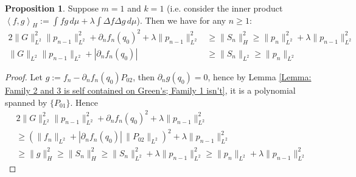 \documentclass[12pt]{amsart}
\theoremstyle{plain}
\theoremstyle{definition}
\newtheorem{proposition}{Proposition}[section]
\newcommand{\inner}[2]{\left \langle #1, #2\right \rangle}
\newcommand{\lap}{\Delta}
\begin{document}
\begin{proposition}\label{k=1L2 and S2 estimates}
Suppose $m=1$ and $k=1$ (i.e. consider the inner product $\inner{f}{g}_H:=\int fg\,d\mu+\lambda\int \lap f\lap g\,d\mu$). Then we have for any $n\ge 1$:
\begin{align}2\|G\|_{L^2}^2\|p_{n-1}\|^2_{L^2}+\partial_nf_n(q_0)^2+\lambda\|p_{n-1}\|_{L^2}^2&\ge\|S_n\|^2_H\ge \|p_n\|_{L^2}^2+\lambda\|p_{n-1}\|_{L^2}^2\label{SobolevH1estimatesk=1}\\
\|G\|_{L^2}\|p_{n-1}\|_{L^2}+|\partial_nf_n(q_0)|&\ge\|S_{n}\|_{L^2}\ge \|p_n\|_{L^2}\label{SobolevL2estimatesk=1}
\end{align}
\end{proposition}

\begin{proof}
Let $g:=f_n-\partial_nf_n(q_0)P_{02}$, then $\partial_n g(q_0)=0$, hence by Lemma \ref{Lemma: Family 2 and 3 is self contained on Green's; Family 1 isn't}, it is a polynomial spanned by $\{P_{01}\}$. Hence
\begin{align}
&2\|G\|_{L^2}^2\|p_{n-1}\|_{L^2}^2+\partial_nf_n(q_0)^2+\lambda\|p_{n-1}\|_{L^2}^2 \nonumber\\
&\ge(\|f_n\|_{L^2}+|\partial_nf_n(q_0)|\,\|P_{02}\|_{L^2})^2+\lambda\|p_{n-1}\|_{L^2}^2 \nonumber\\
&\ge\|g\|_H^2\ge\|S_n\|^2_H\ge\|S_n\|_{L^2}^2+\lambda\|p_{n-1}\|_{L^2}^2\ge\|p_n\|_{L^2}+\lambda\|p_{n-1}\|_{L^2}^2    
\end{align} \end{proof}
\end{document}
